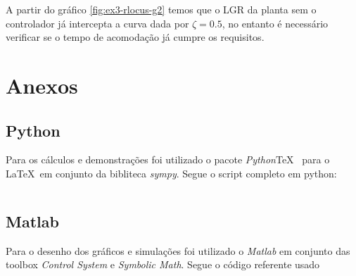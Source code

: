 \documentclass[a4paper,11pt]{article}
\begin{document}
A partir do gráfico \ref{fig:ex3-rlocus-g2} temos que o LGR da planta sem o controlador já intercepta a curva dada por $\zeta = 0.5$, no entanto é necessário verificar se o tempo de acomodação já cumpre os requisitos.




\nocite{sympy}
\nocite{pythontex}
\nocite{matlabcontrol}
\nocite{matlabsymbolic}

\newpage
\section*{Anexos}
\subsection*{Python}

Para os cálculos e demonstrações foi utilizado o pacote \textit{Python}\TeX\ \cite{pythontex} para o \LaTeX\ em conjunto da bibliteca \textit{sympy}\cite{sympy}. Segue o script completo em python:

\inputminted[xleftmargin=15pt,linenos,frame=single,framesep=5pt,breaklines=true]{python}{../python/exsim3.py}

\newpage
\subsection*{Matlab}

Para o desenho dos gráficos e simulações foi utilizado o \textit{Matlab} em conjunto das toolbox \textit{Control System}\cite{matlabcontrol} e \textit{Symbolic Math}\cite{matlabsymbolic}. Segue o código referente usado
\end{document}

